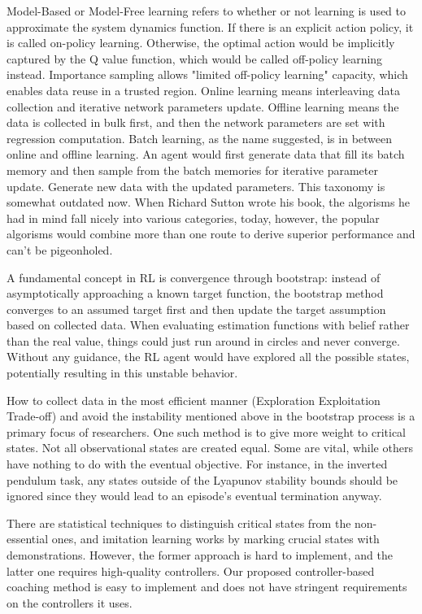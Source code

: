 Model-Based or Model-Free learning refers to whether or not learning is used to approximate the system dynamics function. If there is an explicit action policy, it is called on-policy learning. Otherwise, the optimal action would be implicitly captured by the Q value function, which would be called off-policy learning instead. Importance sampling allows "limited off-policy learning" capacity, which enables data reuse in a trusted region. Online learning means interleaving data collection and iterative network parameters update. Offline learning means the data is collected in bulk first, and then the network parameters are set with regression computation. Batch learning, as the name suggested, is in between online and offline learning. An agent would first generate data that fill its batch memory and then sample from the batch memories for iterative parameter update. Generate new data with the updated parameters. This taxonomy is somewhat outdated now. When Richard Sutton wrote his book\cite{Sutton1998IntroductionTR}, the algorisms he had in mind fall nicely into various categories, today, however, the popular algorisms would combine more than one route to derive superior performance and can't be pigeonholed.

A fundamental concept in RL is convergence through bootstrap: instead of asymptotically approaching a known target function, the bootstrap method converges to an assumed target first and then update the target assumption based on collected data. When evaluating estimation functions with belief rather than the real value, things could just run around in circles and never converge. Without any guidance, the RL agent would have explored all the possible states, potentially resulting in this unstable behavior. 

How to collect data in the most efficient manner (Exploration Exploitation Trade-off) and avoid the instability mentioned above in the bootstrap process is a primary focus of researchers. One such method is to give more weight to critical states. Not all observational states are created equal. Some are vital, while others have nothing to do with the eventual objective. For instance, in the inverted pendulum task, any states outside of the Lyapunov stability bounds should be ignored since they would lead to an episode's eventual termination anyway. 

There are statistical techniques to distinguish critical states from the non-essential ones, and imitation learning works by marking crucial states with demonstrations. However, the former approach is hard to implement, and the latter one requires high-quality controllers. Our proposed controller-based coaching method is easy to implement and does not have stringent requirements on the controllers it uses.

